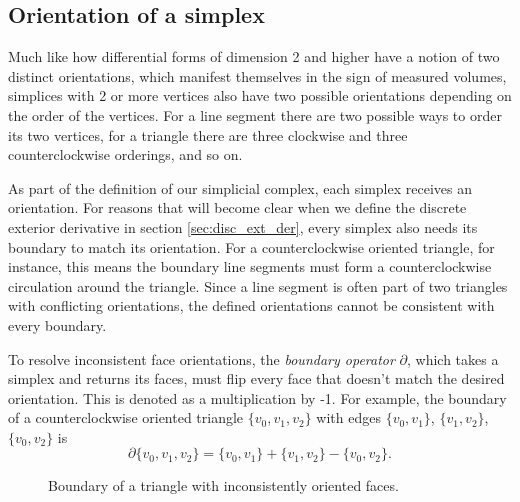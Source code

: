 \documentclass[utf8,english]{gradu3}
\begin{document}
\subsection{Orientation of a simplex}

Much like how differential forms of dimension 2 and higher
have a notion of two distinct orientations,
which manifest themselves in the sign of measured volumes,
simplices with 2 or more vertices also have two possible orientations
depending on the order of the vertices.
For a line segment there are two possible ways to order its two vertices,
for a triangle there are three clockwise and three counterclockwise orderings,
and so on.

As part of the definition of our simplicial complex,
each simplex receives an orientation.
For reasons that will become clear when
we define the discrete exterior derivative in section \ref{sec:disc_ext_der},
every simplex also needs its boundary to match its orientation.
For a counterclockwise oriented triangle, for instance,
this means the boundary line segments must form
a counterclockwise circulation around the triangle.
Since a line segment is often part of two triangles with conflicting orientations,
the defined orientations cannot be consistent with every boundary.

To resolve inconsistent face orientations,
the \textit{boundary operator} $\partial$,
which takes a simplex and returns its faces,
must flip every face that doesn't match the desired orientation.
This is denoted as a multiplication by -1.
For example, the boundary of a counterclockwise oriented triangle $\{v_0, v_1, v_2\}$
with edges $\{v_0, v_1\}$, $\{v_1, v_2\}$, $\{v_0, v_2\}$ is
\[
  \partial \{v_0, v_1, v_2\} = \{v_0, v_1\} + \{v_1, v_2\} - \{v_0, v_2\}.
\]

\begin{figure}[h]
  \centering
  \caption{
    \label{fig:triangle_boundary}
    Boundary of a triangle with inconsistently oriented faces.
  }
\end{figure}
\end{document}
